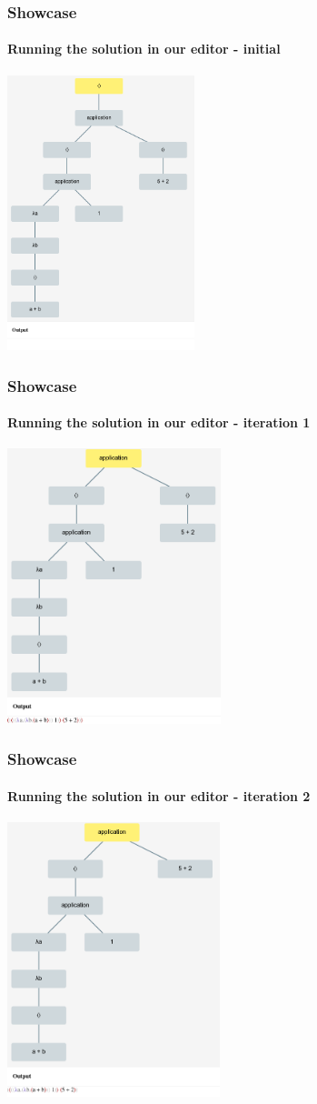 \begin{frame}
    \frametitle{Showcase}
    \framesubtitle{Running the solution in our editor - initial}
    \includegraphics[width=\textwidth, height=8cm]{i0.png}
\end{frame}

\begin{frame}
    \frametitle{Showcase}
    \framesubtitle{Running the solution in our editor - iteration 1}
    \includegraphics[width=\textwidth, height=8cm]{i1.png}
\end{frame}

\begin{frame}
    \frametitle{Showcase}
    \framesubtitle{Running the solution in our editor - iteration 2}
    \includegraphics[width=\textwidth, height=8cm]{i2.png}
\end{frame}

